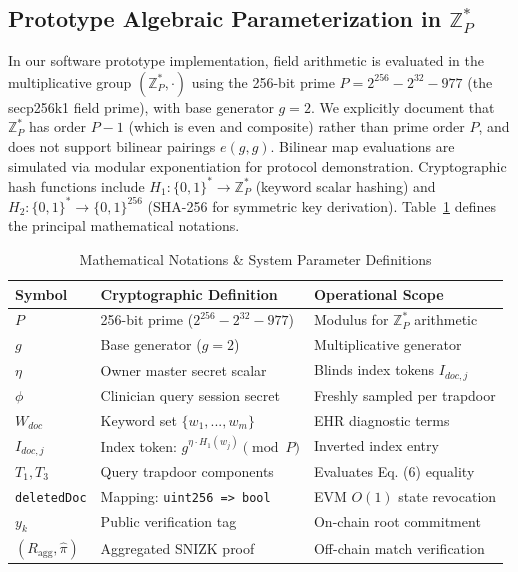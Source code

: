 \documentclass[journal,10pt,twocolumn]{IEEEtran}
\begin{document}
\subsection{Prototype Algebraic Parameterization in $\mathbb{Z}_P^*$}
In our software prototype implementation, field arithmetic is evaluated in the multiplicative group $(\mathbb{Z}_P^*, \cdot)$ using the 256-bit prime $P = 2^{256} - 2^{32} - 977$ (the secp256k1 field prime), with base generator $g = 2$. We explicitly document that $\mathbb{Z}_P^*$ has order $P - 1$ (which is even and composite) rather than prime order $P$, and does not support bilinear pairings $e(g, g)$. Bilinear map evaluations are simulated via modular exponentiation for protocol demonstration. Cryptographic hash functions include $H_1: \{0,1\}^* \to \mathbb{Z}_P^*$ (keyword scalar hashing) and $H_2: \{0,1\}^* \to \{0,1\}^{256}$ (SHA-256 for symmetric key derivation). Table~\ref{tab:symbols} defines the principal mathematical notations.

\begin{table}[t]
\caption{Mathematical Notations \& System Parameter Definitions}
\label{tab:symbols}
\centering
\begin{tabular}{lll}
\toprule
\textbf{Symbol} & \textbf{Cryptographic Definition} & \textbf{Operational Scope} \\
\midrule
$P$ & 256-bit prime ($2^{256} - 2^{32} - 977$) & Modulus for $\mathbb{Z}_P^*$ arithmetic \\
$g$ & Base generator ($g = 2$) & Multiplicative generator \\
$\eta$ & Owner master secret scalar & Blinds index tokens $I_{doc,j}$ \\
$\phi$ & Clinician query session secret & Freshly sampled per trapdoor \\
$W_{doc}$ & Keyword set $\{w_1, ..., w_m\}$ & EHR diagnostic terms \\
$I_{doc,j}$ & Index token: $g^{\eta \cdot H_1(w_j)} \pmod P$ & Inverted index entry \\
$T_1, T_3$ & Query trapdoor components & Evaluates Eq. (6) equality \\
\texttt{deletedDoc} & Mapping: \texttt{uint256 => bool} & EVM $O(1)$ state revocation \\
$y_k$ & Public verification tag & On-chain root commitment \\
$(R_{\text{agg}}, \hat{\pi})$ & Aggregated SNIZK proof & Off-chain match verification \\
\bottomrule
\end{tabular}
\end{table}
\end{document}
